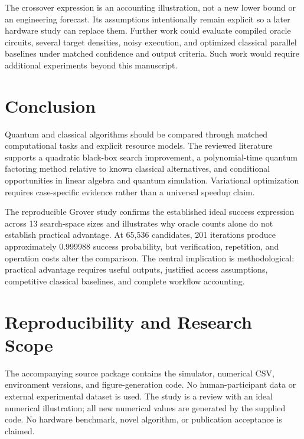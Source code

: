 \documentclass[conference]{IEEEtran}
\begin{document}
The crossover expression is an accounting illustration, not a new lower bound or an engineering forecast. Its assumptions intentionally remain explicit so a later hardware study can replace them. Further work could evaluate compiled oracle circuits, several target densities, noisy execution, and optimized classical parallel baselines under matched confidence and output criteria. Such work would require additional experiments beyond this manuscript.

\balance
\section{Conclusion}
Quantum and classical algorithms should be compared through matched computational tasks and explicit resource models. The reviewed literature supports a quadratic black-box search improvement, a polynomial-time quantum factoring method relative to known classical alternatives, and conditional opportunities in linear algebra and quantum simulation. Variational optimization requires case-specific evidence rather than a universal speedup claim.

The reproducible Grover study confirms the established ideal success expression across 13 search-space sizes and illustrates why oracle counts alone do not establish practical advantage. At 65,536 candidates, 201 iterations produce approximately 0.999988 success probability, but verification, repetition, and operation costs alter the comparison. The central implication is methodological: practical advantage requires useful outputs, justified access assumptions, competitive classical baselines, and complete workflow accounting.

\section*{Reproducibility and Research Scope}
The accompanying source package contains the simulator, numerical CSV, environment versions, and figure-generation code. No human-participant data or external experimental dataset is used. The study is a review with an ideal numerical illustration; all new numerical values are generated by the supplied code. No hardware benchmark, novel algorithm, or publication acceptance is claimed.
\end{document}
